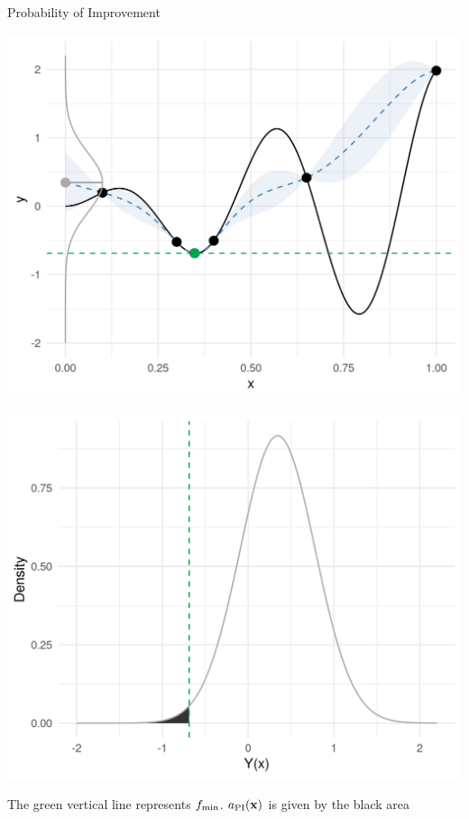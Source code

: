 \documentclass[11pt,compress,t,notes=noshow, xcolor=table]{beamer}
\begin{document}
\begin{vbframe}{Probability of Improvement}
\begin{minipage}[b]{0.45\textwidth}
  \includegraphics[width = \textwidth]{figure_man/bayesian_loop_sm_normal_fmin.png}
\end{minipage}
\hfill
\begin{minipage}[b]{0.45\textwidth}
  \includegraphics[width = \textwidth]{figure_man/bayesian_loop_pi_0.png}
\end{minipage}

\begin{footnotesize}
The green vertical line represents $f_{\min}$. $a_{\text{PI}}(\mathbf{x})$ is given by the black area
\end{footnotesize}


\end{vbframe}
\end{document}
